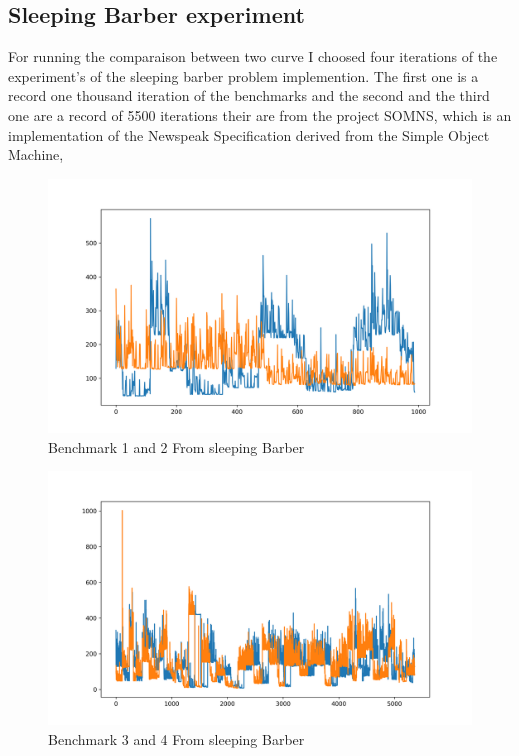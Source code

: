 \documentclass{article}
\begin{document}
\subsection{ Sleeping Barber experiment}

For running the comparaison between two curve I choosed four iterations of the experiment's of the sleeping barber problem implemention. The first one is a record one thousand iteration of the benchmarks and the second and the third one are a record of 5500 iterations their are from the project SOMNS, which is an implementation of the Newspeak Specification derived from the Simple Object Machine,

\begin{figure}[h!]
    \centering
    \includegraphics[width=1\textwidth]{plot_0.png}
    \caption{Benchmark 1 and 2 From sleeping Barber}
    \label{fig:bench_1_2}
\end{figure}


\begin{figure}[h!]
    \centering
    \includegraphics[width=1\textwidth]{plot_1.png}
    \caption{Benchmark 3 and 4 From sleeping Barber}
    \label{fig:bench_2_3}
\end{figure}
\end{document}

